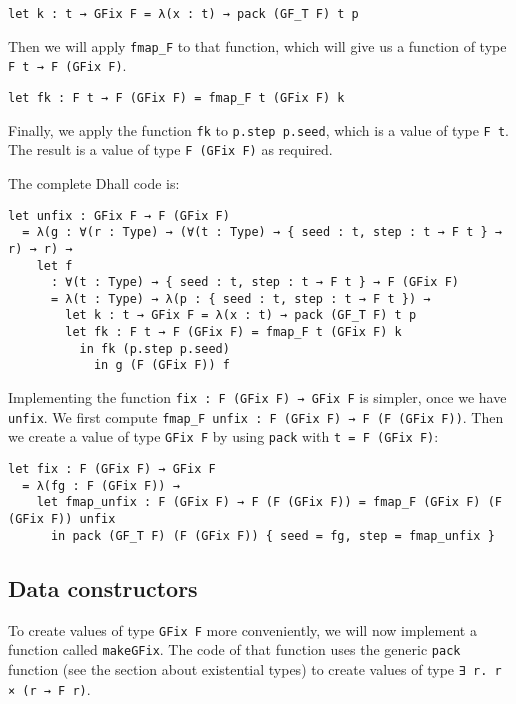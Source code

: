 \begin{lstlisting}[language=Dhall]
let k : t → GFix F = λ(x : t) → pack (GF_T F) t p
\end{lstlisting}


Then we will apply \lstinline!fmap_F! to that function, which will give us a function of type \lstinline!F t → F (GFix F)!.


\begin{lstlisting}[language=Dhall]
let fk : F t → F (GFix F) = fmap_F t (GFix F) k
\end{lstlisting}


Finally, we apply the function \lstinline!fk! to \lstinline!p.step p.seed!, which is a value of type \lstinline!F t!.
The result is a value of type \lstinline!F (GFix F)! as required.


The complete Dhall code is:


\begin{lstlisting}[language=Dhall]
let unfix : GFix F → F (GFix F)
  = λ(g : ∀(r : Type) → (∀(t : Type) → { seed : t, step : t → F t } → r) → r) →
    let f
      : ∀(t : Type) → { seed : t, step : t → F t } → F (GFix F)
      = λ(t : Type) → λ(p : { seed : t, step : t → F t }) →
        let k : t → GFix F = λ(x : t) → pack (GF_T F) t p
        let fk : F t → F (GFix F) = fmap_F t (GFix F) k
          in fk (p.step p.seed)
            in g (F (GFix F)) f
\end{lstlisting}


Implementing the function \lstinline!fix : F (GFix F) → GFix F! is simpler, once we have \lstinline!unfix!.
We first compute \lstinline!fmap_F unfix : F (GFix F) → F (F (GFix F))!.
Then we create a value of type \lstinline!GFix F! by using \lstinline!pack! with \lstinline!t = F (GFix F)!: 


\begin{lstlisting}[language=Dhall]
let fix : F (GFix F) → GFix F
  = λ(fg : F (GFix F)) →
    let fmap_unfix : F (GFix F) → F (F (GFix F)) = fmap_F (GFix F) (F (GFix F)) unfix
      in pack (GF_T F) (F (GFix F)) { seed = fg, step = fmap_unfix }
\end{lstlisting}


\subsection{Data constructors}


To create values of type \lstinline!GFix F! more conveniently, we will now implement a function called \lstinline!makeGFix!.
The code of that function uses the generic \lstinline!pack! function (see the section about existential types) to create values of type \lstinline!∃ r. r × (r → F r)!.


